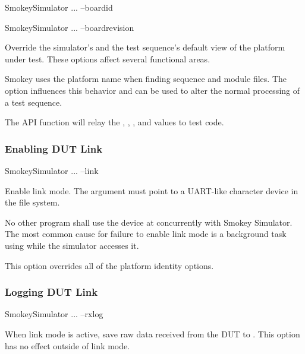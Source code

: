 \begin{CommandLine}
SmokeySimulator ... --boardid ~~
\end{CommandLine}

\begin{CommandLine}
SmokeySimulator ... --boardrevision ~~
\end{CommandLine}

Override the simulator's and the test sequence's default view of the platform
under test.  These options affect several functional areas.

Smokey uses the platform name when finding sequence and module files.  The
option  influences this behavior and can be used to alter
the normal processing of a test sequence.

The  API function will relay the
, , , and 
values to test code.

\subsubsection{Enabling DUT Link}

\begin{CommandLine}
SmokeySimulator ... --link ~~
\end{CommandLine}

Enable link mode.  The argument  must point to a UART-like
character device in the file system.

No other program shall use the device at  concurrently with
Smokey Simulator.  The most common cause for failure to enable link mode is a
background task using  while the simulator accesses it.

This option overrides all of the platform identity options.

\subsubsection{Logging DUT Link}

\begin{CommandLine}
SmokeySimulator ... --rxlog ~~
\end{CommandLine}

When link mode is active, save raw data received from the DUT to
.  This option has no effect outside of link mode.  

